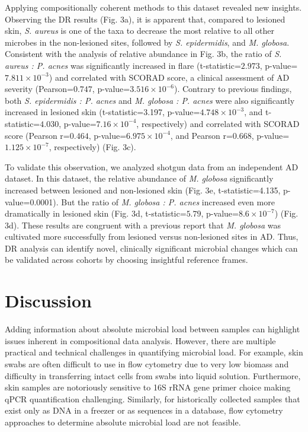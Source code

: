 Applying compositionally coherent methods to this dataset revealed new insights. Observing the DR results (Fig. 3a), it is apparent that, compared to lesioned skin, \textit{S. aureus} is one of the taxa to decrease the most relative to all other microbes in the non-lesioned sites, followed by \textit{S. epidermidis}, and \textit{M. globosa}. Consistent with the analysis of relative abundance in Fig. 3b, the ratio of \textit{S. aureus : P. acnes} was significantly increased in flare (t-statistic=$2.973$, p-value=$7.811\times 10^{-3}$) and correlated with SCORAD score, a clinical assessment of AD severity (Pearson=$0.747$, p-value=$3.516\times 10^{-6}$). Contrary to previous findings, both \textit{S. epidermidis : P. acnes} and \textit{M. globosa : P. acnes} were also significantly increased in lesioned skin (t-statistic=3.197, p-value=$4.748\times 10^{-3}$, and t-statistic=$4.030$, p-value=$7.16\times 10^{-4}$, respectively) and correlated with SCORAD score (Pearson r=$0.464$, p-value=$6.975 \times 10^{-4}$, and Pearson r=$0.668$, p-value=$1.125\times 10^{-7}$, respectively) (Fig. 3c).

To validate this observation, we analyzed shotgun data from an independent AD dataset\cite{Leung-DYM}.  In this dataset, the relative abundance of \textit{M. globosa} significantly increased between lesioned and non-lesioned skin (Fig. 3e, t-statistic=4.135, p-value=0.0001). But the ratio of \textit{M. globosa : P. acnes} increased even more dramatically in lesioned skin (Fig. 3d, t-statistic=$5.79$, p-value=$8.6 \times 10^{-7}$) (Fig. 3d). These results are congruent with a previous report that \textit{M. globosa} was cultivated more successfully from lesioned versus non-lesioned sites in AD\cite{Falk2005-we}. Thus, DR analysis can identify novel, clinically significant microbial changes which can be validated across cohorts by choosing insightful reference frames.

\section*{Discussion}
Adding information about absolute microbial load between samples can highlight issues inherent in compositional data analysis. However, there are multiple practical and technical challenges in quantifying microbial load. For example, skin swabs are often difficult to use in flow cytometry due to very low biomass and difficulty in transferring intact cells from swabs into liquid solution. Furthermore, skin samples are notoriously sensitive to 16S rRNA gene primer choice making qPCR quantification challenging\cite{Meisel2016-mp}. Similarly, for historically collected samples that exist only as DNA in a freezer or as sequences in a database, flow cytometry approaches to determine absolute microbial load are not feasible.

